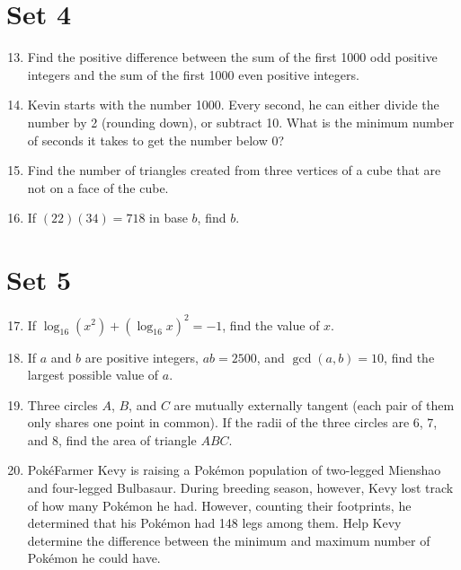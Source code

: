 \documentclass[11pt]{article}
\theoremstyle{definition}
\begin{document}
\eject
\section*{Set 4}
\begin{enumerate}
\setcounter{enumi}{12}
\item Find the positive difference between the sum of the first 1000 odd positive integers and the sum of the first 1000 even positive integers.
\item Kevin starts with the number 1000. Every second, he can either divide the number by 2 (rounding down), or subtract 10. What is the minimum number of seconds it takes to get the number below 0?
\item Find the number of triangles created from three vertices of a cube that are not on a face of the cube.
\item If $(22)(34) = 718$ in base $b$, find $b$.
\end{enumerate}

\eject
\section*{Set 5}
\begin{enumerate}
\setcounter{enumi}{16}
\item If $\log_{16}(x^2) + (\log_{16}{x})^2 = -1$, find the value of $x$.
\item If $a$ and $b$ are positive integers, $ab = 2500$, and $\gcd(a,b) = 10$, find the largest possible value of $a$.
\item Three circles $A$, $B$, and $C$ are mutually externally tangent (each pair of them only shares one point in common). If the radii of the three circles are 6, 7, and 8, find the area of triangle $ABC$.
\item Pok\'{e}Farmer Kevy is raising a Pok\'{e}mon population of two-legged Mienshao and four-legged Bulbasaur. During breeding season, however, Kevy lost track of how many Pok\'{e}mon he had. However, counting their footprints, he determined that his Pok\'{e}mon had 148 legs among them. Help Kevy determine the difference between the minimum and maximum number of Pok\'{e}mon he could have.
\end{enumerate}

\eject
\end{document}
